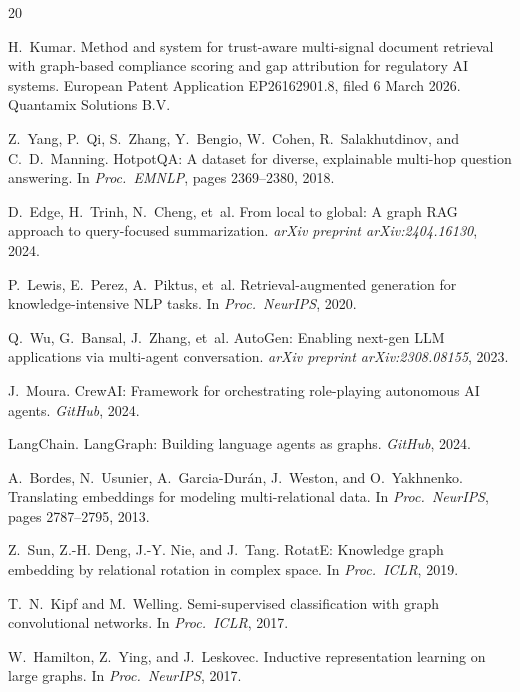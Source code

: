 \documentclass[a4paper,11pt]{article}
\theoremstyle{definition}
\begin{document}
\begingroup
\small
\begin{thebibliography}{20}

H.~Kumar.
\newblock Method and system for trust-aware multi-signal document retrieval with graph-based compliance scoring and gap attribution for regulatory AI systems.
\newblock European Patent Application EP26162901.8, filed 6 March 2026. Quantamix Solutions B.V.

Z.~Yang, P.~Qi, S.~Zhang, Y.~Bengio, W.~Cohen, R.~Salakhutdinov, and C.~D.~Manning.
\newblock HotpotQA: A dataset for diverse, explainable multi-hop question answering.
\newblock In \textit{Proc.\ EMNLP}, pages 2369--2380, 2018.

D.~Edge, H.~Trinh, N.~Cheng, et~al.
\newblock From local to global: A graph RAG approach to query-focused summarization.
\newblock \textit{arXiv preprint arXiv:2404.16130}, 2024.

P.~Lewis, E.~Perez, A.~Piktus, et~al.
\newblock Retrieval-augmented generation for knowledge-intensive NLP tasks.
\newblock In \textit{Proc.\ NeurIPS}, 2020.

Q.~Wu, G.~Bansal, J.~Zhang, et~al.
\newblock AutoGen: Enabling next-gen LLM applications via multi-agent conversation.
\newblock \textit{arXiv preprint arXiv:2308.08155}, 2023.

J.~Moura.
\newblock CrewAI: Framework for orchestrating role-playing autonomous AI agents.
\newblock \textit{GitHub}, 2024.

LangChain.
\newblock LangGraph: Building language agents as graphs.
\newblock \textit{GitHub}, 2024.

A.~Bordes, N.~Usunier, A.~Garcia-Dur\'{a}n, J.~Weston, and O.~Yakhnenko.
\newblock Translating embeddings for modeling multi-relational data.
\newblock In \textit{Proc.\ NeurIPS}, pages 2787--2795, 2013.

Z.~Sun, Z.-H. Deng, J.-Y. Nie, and J.~Tang.
\newblock RotatE: Knowledge graph embedding by relational rotation in complex space.
\newblock In \textit{Proc.\ ICLR}, 2019.

T.~N.~Kipf and M.~Welling.
\newblock Semi-supervised classification with graph convolutional networks.
\newblock In \textit{Proc.\ ICLR}, 2017.

W.~Hamilton, Z.~Ying, and J.~Leskovec.
\newblock Inductive representation learning on large graphs.
\newblock In \textit{Proc.\ NeurIPS}, 2017.


\end{thebibliography}
\end{document}
